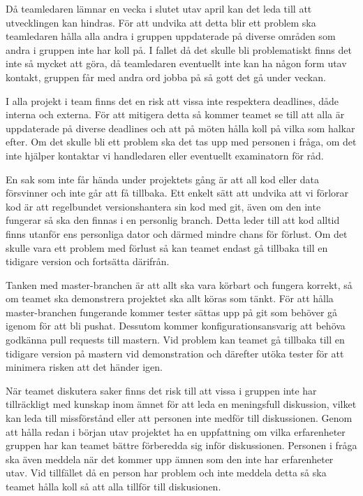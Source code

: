 {
    Då teamledaren lämnar en vecka i slutet utav april kan det leda till att utvecklingen kan
    hindras. För att undvika att detta blir ett problem ska teamledaren hålla alla andra i
    gruppen uppdaterade på diverse områden som andra i gruppen inte har koll på. I fallet då det skulle bli
    problematiskt finns det inte så mycket att göra, då teamledaren eventuellt inte kan ha någon form utav kontakt,
    gruppen får med andra ord jobba på så gott det gå under veckan.
}

{
   I alla projekt i team finns det en risk att vissa inte respektera deadlines, dåde interna och
   externa. För att mitigera detta så kommer teamet se till att alla är uppdaterade på
   diverse deadlines och att på möten hålla koll på vilka som halkar efter. Om det skulle bli
   ett problem ska det tas upp med personen i fråga, om det inte hjälper kontaktar vi handledaren
   eller eventuellt examinatorn för råd.
}

{
    En sak som inte får hända under projektets gång är att all kod eller data försvinner och 
    inte går att få tillbaka. Ett enkelt sätt att undvika att vi förlorar kod är att regelbundet
    versionshantera sin kod med git, även om den inte fungerar så ska den finnas i en personlig
    branch. Detta leder till att kod alltid finns utanför ens personliga dator och därmed mindre
    chans för förlust. Om det skulle vara ett problem med förlust så kan teamet endast gå 
    tillbaka till en tidigare version och fortsätta därifrån.
}

{
    Tanken med master-branchen är att allt ska vara körbart och fungera korrekt, så om teamet ska
    demonstrera projektet ska allt köras som tänkt. För att hålla master-branchen fungerande
    kommer tester sättas upp på git som behöver gå igenom för att bli pushat. Dessutom kommer
    konfigurationsansvarig att behöva godkänna pull requests till mastern. Vid problem kan teamet
    gå tillbaka till en tidigare version på mastern vid demonstration och därefter utöka tester
    för att minimera risken att det händer igen.
}

{
   När teamet diskutera saker finns det risk till att vissa i gruppen inte har tillräckligt med
   kunskap inom ämnet för att leda en meningsfull diskussion, vilket kan leda till missförstånd
   eller att personen inte medför till diskussionen. Genom att hålla redan i början utav
   projektet ha en uppfattning om vilka erfarenheter gruppen har kan teamet bättre förberedda sig
   inför diskussionen. Personen i fråga ska även meddela när det kommer upp ämnen som den inte
   har erfarenheter utav. Vid tillfället då en person har problem och inte meddela detta så
   ska teamet hålla koll så att alla tillför till diskusionen. 
}
